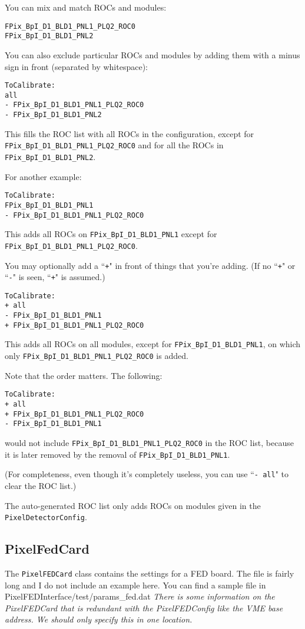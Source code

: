 You can mix and match ROCs and modules:
\begin{verbatim}
FPix_BpI_D1_BLD1_PNL1_PLQ2_ROC0
FPix_BpI_D1_BLD1_PNL2
\end{verbatim}

You can also exclude particular ROCs and modules by adding them with a 
minus sign in front (separated by whitespace):
\begin{verbatim}
ToCalibrate:
all
- FPix_BpI_D1_BLD1_PNL1_PLQ2_ROC0
- FPix_BpI_D1_BLD1_PNL2
\end{verbatim}
This fills the ROC list with all ROCs in the configuration, except 
for \verb|FPix_BpI_D1_BLD1_PNL1_PLQ2_ROC0| and for all the ROCs 
in \verb|FPix_BpI_D1_BLD1_PNL2|.

For another example:
\begin{verbatim}
ToCalibrate:
FPix_BpI_D1_BLD1_PNL1
- FPix_BpI_D1_BLD1_PNL1_PLQ2_ROC0
\end{verbatim}
This adds all ROCs on \verb|FPix_BpI_D1_BLD1_PNL1| except 
for \verb|FPix_BpI_D1_BLD1_PNL1_PLQ2_ROC0|.

You may optionally add a ``\verb|+|" in front of things that 
you're adding. (If no ``\verb|+|" or ``\verb|-|" is seen, ``\verb|+|" is 
assumed.)
\begin{verbatim}
ToCalibrate:
+ all
- FPix_BpI_D1_BLD1_PNL1
+ FPix_BpI_D1_BLD1_PNL1_PLQ2_ROC0
\end{verbatim}
This adds all ROCs on all modules, except 
for \verb|FPix_BpI_D1_BLD1_PNL1|, on which 
only \verb|FPix_BpI_D1_BLD1_PNL1_PLQ2_ROC0| is added.

Note that the order matters. The following:
\begin{verbatim}
ToCalibrate:
+ all
+ FPix_BpI_D1_BLD1_PNL1_PLQ2_ROC0
- FPix_BpI_D1_BLD1_PNL1
\end{verbatim}
would not include \verb|FPix_BpI_D1_BLD1_PNL1_PLQ2_ROC0| in the 
ROC list, because it is later removed by the 
removal of \verb|FPix_BpI_D1_BLD1_PNL1|.

(For completeness, even though it's completely useless, you 
can use ``\verb|- all|" to clear the ROC list.)

The auto-generated ROC list only adds ROCs on modules 
given in the \verb|PixelDetectorConfig|.

\subsection{PixelFedCard}

The {\tt PixelFEDCard} class contains the settings for a FED board.
The file is fairly long and I do not include an example here. 
You can find a sample file in PixelFEDInterface/test/params\_fed.dat 
{\it There is some information on the PixelFEDCard that is 
redundant with the PixelFEDConfig like the VME base address. We
should only specify this in one location.}

